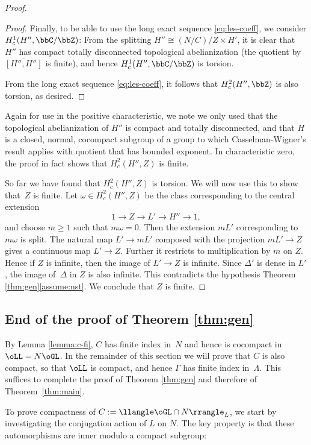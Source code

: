 \begin{proof}
\begin{proof}
Finally, to be able to use the long exact sequence \eqref{eq:les-coeff}, we consider $H^1_c(H'',\bbC/\bbZ)$: From the splitting $H''\cong (N/C)/Z\times H'$, it is clear that $H''$ has compact totally disconnected topological abelianization (\ie the quotient by $\overline{[H'',H'']}$ is finite), and hence $H^1_c(H'',\bbC/\bbZ)$ is torsion.

From the long exact sequence \eqref{eq:les-coeff}, it follows that $H^2_c(H'',\bbZ)$ is also torsion, as desired.\end{proof}

\begin{rem} Again for use in the positive characteristic, we note we only used that the topological abelianization of $H''$ is compact and totally disconnected, and that $H$ is a closed, normal, cocompact subgroup of a group to which Casselman-Wigner's result applies with quotient that has bounded exponent. In characteristic zero, the proof in fact shows that $H^2_c(H'',Z)$ is finite. \end{rem}

So far we have found that $H^2_c(H'',Z)$ is torsion. We will now use this to show that~$Z$ is finite. Let $\omega\in H^2_c(H'',Z)$ be the class corresponding to the central extension
\[
1\to Z\to L'\to H''\to 1,
\]
and choose $m\geq 1$ such that $m\omega =0$. Then the extension $mL'$ corresponding to $m\omega$ is split. The natural map $L'\to mL'$ composed with the projection $mL'\to Z$ gives a continuous map $L'\to Z$. Further it restricts to multiplication by $m$ on $Z$. Hence if $Z$ is infinite, then the image of $L'\to Z$ is infinite. Since $\Delta'$ is dense in $L'$, the image of~$\Delta$ in $Z$ is also infinite. This contradicts the hypothesis Theorem \ref{thm:gen}\eqref{assume:nst}. We conclude that $Z$ is finite. \end{proof}

\subsection{End of the proof of Theorem \ref{thm:gen}}\label{sec:end}

By Lemma \ref{lemma:c-fi}, $C$ has finite index in~$N$ and hence is cocompact in $\oLL=N\oGL$. In the remainder of this section we will prove that $C$ is also compact, so that $\oLL$ is compact, and hence $\Gamma$ has finite index in~$\Lambda$. This suffices to complete the proof of Theorem \ref{thm:gen} and therefore of Theorem~\ref{thm:main}.

To prove compactness of $C :=\llangle \oGL\cap N\rrangle_L$, we start by investigating the conjugation action of $L$ on $N$. The key property is that these automorphisms are inner modulo a compact subgroup:

